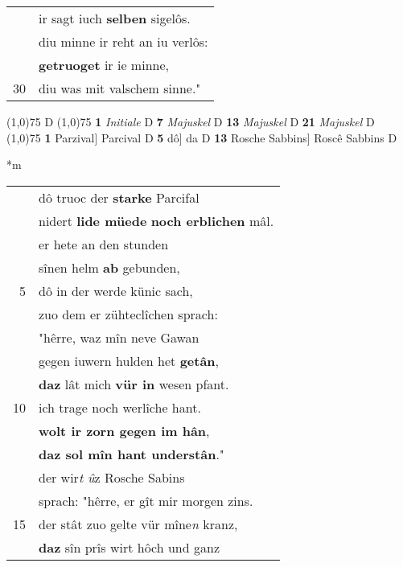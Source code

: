 \documentclass[8pt,a4paper,notitlepage]{article}
\begin{document}
\begin{table}[ht]
\begin{minipage}[t]{0.5\linewidth}
\begin{tabular}{rl}
 & ir sagt iuch \textbf{selben} sigelôs.\\ 
 & diu minne ir reht an iu verlôs:\\ 
 & \textbf{getruoget} ir ie minne,\\ 
30 & diu was mit valschem sinne."\\ 
\end{tabular}
\scriptsize
\line(1,0){75} \newline
D \newline
\line(1,0){75} \newline
\textbf{1} \textit{Initiale} D  \textbf{7} \textit{Majuskel} D  \textbf{13} \textit{Majuskel} D  \textbf{21} \textit{Majuskel} D  \newline
\line(1,0){75} \newline
\textbf{1} Parzival] Parcival D \textbf{5} dô] da D \textbf{13} Rosche Sabbins] Roscê Sabbins D \newline
\end{minipage}
\hspace{0.5cm}
\begin{minipage}[t]{0.5\linewidth}
\small
\begin{center}*m
\end{center}
\begin{tabular}{rl}
 & dô truoc der \textbf{starke} Parcifal\\ 
 & nidert \textbf{lide müede} \textbf{noch erblichen} mâl.\\ 
 & er hete an den stunden\\ 
 & sînen helm \textbf{ab} gebunden,\\ 
5 & dô in der werde künic sach,\\ 
 & zuo dem er zühteclîchen sprach:\\ 
 & "hêrre, waz mîn neve Gawan\\ 
 & gegen iuwern hulden het \textbf{getân},\\ 
 & \textbf{daz} lât mich \textbf{vür in} wesen pfant.\\ 
10 & ich trage noch werlîche hant.\\ 
 & \textbf{wolt ir zorn gegen im hân},\\ 
 & \textbf{daz sol mîn hant understân}."\\ 
 & der wir\textit{t û}z Rosche Sabins\\ 
 & sprach: "hêrre, er gît mir morgen zins.\\ 
15 & der stât zuo gelte vür mîne\textit{n} kranz,\\ 
 & \textbf{daz} sîn prîs wirt hôch und ganz\\ 

\end{tabular}
\end{minipage}
\end{table}
\end{document}
